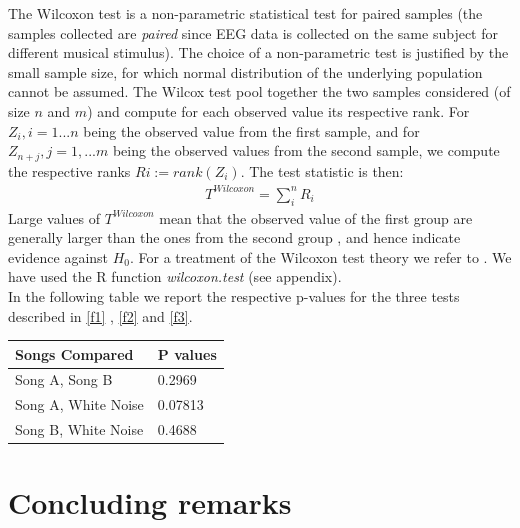 \documentclass[twocolumn,superscriptaddress]{revtex4-1}
\theoremstyle{definition}
\theoremstyle{remark}
\begin{document}
The Wilcoxon test is a non-parametric statistical test for paired samples (the samples collected are \textit{paired} since EEG data is collected on the same subject for different musical stimulus). The choice of a non-parametric test  is justified by the small sample size, for which normal distribution of the underlying population cannot be assumed. The Wilcox test pool together the two samples considered (of size $n$ and $m$)  and compute for each observed value its respective rank. For $Z_i, i=1...n$ being the observed value from the first sample, and for $Z_{n+j}, j=1,...m$ being the observed values from the second sample, we compute the respective ranks $Ri := rank(Z_i)$. The test statistic is then:
\begin{align}
T^{Wilcoxon} = \sum_i^{n} R_i
\end{align}
Large values of $T^{Wilcoxon}$ mean that the observed value of the first group are generally larger than the ones from the second group , and hence indicate evidence against $H_0$. For a treatment of the Wilcoxon test theory we refer to \cite{sara}. We have used the R function \textit{wilcoxon.test} (see appendix).\\

In the following table we report the respective p-values for the three tests described in \ref{f1} ,  \ref{f2} and \ref{f3}. 
\\
\vspace{10pt}

\begin{tabular}{ l | l  }
Songs Compared & P values \\ \hline
  Song A, Song B	& 0.2969 \\
  Song A, White Noise & 0.07813\\
  Song B, White Noise & 0.4688
\end{tabular}







\section{Concluding remarks} \label{concl}%
\end{document}
